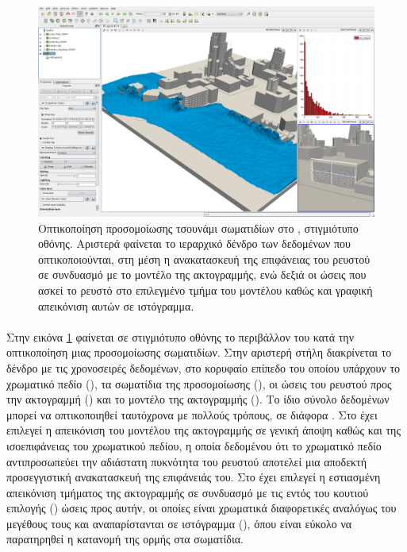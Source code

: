 \begin{figure}
  \centering
  \includegraphics[width=\textwidth]{figures/paraview-interface.png}
  \caption[Οπτικοποίηση προσομοίωσης] {Οπτικοποίηση προσομοίωσης τσουνάμι 
    σωματιδίων στο , στιγμιότυπο οθόνης. Αριστερά φαίνεται το ιεραρχικό
    δένδρο των δεδομένων που οπτικοποιούνται, στη μέση η ανακατασκευή της επιφάνειας του
    ρευστού σε συνδυασμό με το μοντέλο της ακτογραμμής, ενώ δεξιά οι ώσεις που ασκεί το
    ρευστό στο επιλεγμένο τμήμα του μοντέλου καθώς και γραφική απεικόνιση αυτών σε
    ιστόγραμμα.}
  \label{fig:paraview-interface}
\end{figure}

\paragraph{} Στην εικόνα \ref{fig:paraview-interface} φαίνεται σε στιγμιότυπο οθόνης το
περιβάλλον του  κατά την οπτικοποίηση μιας προσομοίωσης 
σωματιδίων. Στην αριστερή στήλη διακρίνεται το δένδρο με τις χρονοσειρές δεδομένων, στο
κορυφαίο επίπεδο του οποίου υπάρχουν το χρωματικό πεδίο (), τα σωματίδια
της προσομοίωσης (), οι ώσεις του ρευστού προς την ακτογραμμή
() και το μοντέλο της ακτογραμμής (). Το ίδιο
σύνολο δεδομένων μπορεί να οπτικοποιηθεί ταυτόχρονα με πολλούς τρόπους, σε διάφορα
. Στο  έχει επιλεγεί η απεικόνιση του μοντέλου της
ακτογραμμής σε γενική άποψη καθώς και της ισοεπιφάνειας του χρωματικού πεδίου, η οποία
δεδομένου ότι το χρωματικό πεδίο αντιπροσωπεύει την αδιάστατη πυκνότητα του ρευστού
αποτελεί μια αποδεκτή προσεγγιστική ανακατασκευή της επιφάνειάς του. Στο 
έχει επιλεγεί η εστιασμένη απεικόνιση τμήματος της ακτογραμμής σε συνδυασμό με τις εντός
του κουτιού επιλογής () ώσεις προς αυτήν, οι οποίες είναι χρωματικά διαφορετικές
αναλόγως του μεγέθους τους και αναπαρίστανται σε ιστόγραμμα (), όπου
είναι εύκολο να παρατηρηθεί η κατανομή της ορμής στα σωματίδια.

